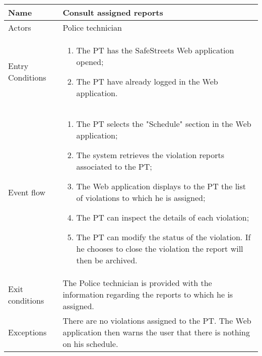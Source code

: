 \begin{table}[H]
  \centering
  \begin{tabularx}{\textwidth}{ |l|X| }
    \hline
    Name & Consult assigned reports \\
    \hline
    Actors & Police technician\\
    \hline
    Entry Conditions & \begin{enumerate}[noitemsep]
                        \item The PT has the SafeStreets Web application opened;
                        \item The PT have already logged in the Web application.
                      \end{enumerate}\\
    \hline
    Event flow & \begin{enumerate}[noitemsep]
                    \item The PT selects the "Schedule" section in the Web application;
                    \item The system retrieves the violation reports associated to the PT;
                    \item The Web application displays to the PT the list of violations to which he is assigned;
                    \item The PT can inspect the details of each violation;
                    \item The PT can modify the status of the violation. If he chooses to close the violation the report will then be archived.           
                \end{enumerate}\\
    \hline
    Exit conditions & The Police technician is provided with the information regarding the reports to which he is assigned.\\ 
    \hline
    Exceptions &  There are no violations assigned to the PT. The Web application then warns the user that there is nothing on his schedule. \\
    \hline
  \end{tabularx}
\end{table}
